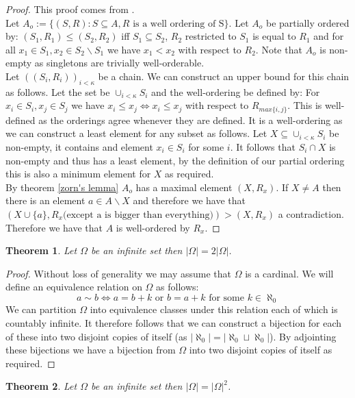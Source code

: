 \documentclass{report}
\newtheorem{theorem}{Theorem}[section]
\begin{document}
\begin{proof}
This proof comes from \cite{well orderable}.\\
Let $A_o:=\{(S,R):S \subseteq A, R\text{ is a well ordering of S}\}$. Let $A_o$ be partially ordered by: $(S_1,R_1) \leq (S_2,R_2)$ iff $S_1 \subseteq S_2$, $R_2$ restricted to $S_1$ is equal to $R_1$ and for all $x_1\in S_1,x_2 \in S_2\backslash S_1$ we have $x_1<x_2$ with respect to $R_2$. Note that $A_o$ is non-empty as singletons are trivially well-orderable.\\
Let $((S_i,R_i))_{i<\kappa}$ be a chain. We can construct an upper bound for this chain as follows. Let the set be $\cup_{i<\kappa}S_i$ and the well-ordering be defined by: For $x_i \in S_i,x_j\in S_j$ we have $x_i\leq x_j \iff x_i\leq x_j$ with respect to $R_{max\{i,j\}}$. This is well-defined as the orderings agree whenever they are defined. It is a well-ordering as we can construct a least element for any subset as follows. Let $X\subseteq \cup_{i<\kappa}S_i$ be non-empty, it contains and element $x_i\in S_i$ for some $i$. It follows that $S_i\cap X$ is non-empty and thus has a least element, by the definition of our partial ordering this is also a minimum element for $X$ as required.\\
By theorem \ref{zorn's lemma} $A_o$ has a maximal element $(X,R_x)$. If $X \neq A$ then there is an element $a \in A \backslash X$ and therefore we have that $(X\cup\{a\},R_x \text{(except a is bigger than everything)}) > (X,R_x)$ a contradiction. Therefore we have that $A$ is well-ordered by $R_x$.
\end{proof}
\begin{theorem}\label{double cardinal}
Let $\Omega$ be an infinite set then $\vert \Omega \vert = 2\vert \Omega \vert$.
\end{theorem}
\begin{proof}
Without loss of generality we may assume that $\Omega$ is a cardinal. We will define an equivalence relation on $\Omega$ as follows: 
\[ a \sim b \iff a=b+k \text{ or } b=a+k \text{ for some }k \in \aleph_0\]
We can partition $\Omega$ into equivalence classes under this relation each of which is countably infinite. It therefore follows that we can construct a bijection for each of these into two disjoint copies of itself (as $\vert \aleph_0 \vert =\vert \aleph_0 \sqcup \aleph_0 \vert$). By adjointing these bijections we have a bijection from $\Omega$ into two disjoint copies of itself as required.
\end{proof}
\begin{theorem}
Let $\Omega$ be an infinite set then $\vert \Omega \vert = \vert \Omega \vert^2$.
\end{theorem}\par
\end{document}
